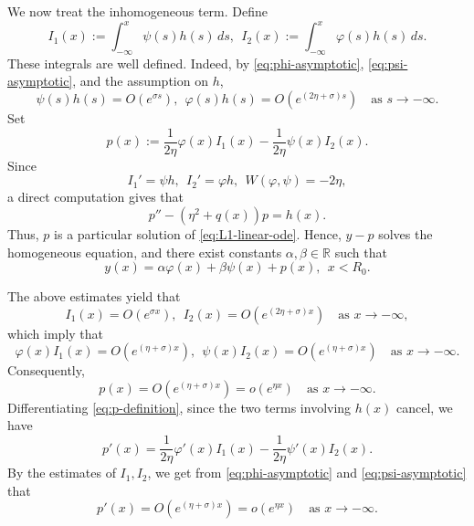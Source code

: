 \documentclass[11pt]{article}
\numberwithin{equation}{section}
\theoremstyle{definition}
\begin{document}
\medskip
{}
	
We now treat the inhomogeneous term. Define
\[
I_1(x):=\int_{-\infty}^{x}\psi(s)h(s)\,ds,
\ \
I_2(x):=\int_{-\infty}^{x}\varphi(s)h(s)\,ds .
\]
These integrals are well defined. Indeed, by \eqref{eq:phi-asymptotic},
\eqref{eq:psi-asymptotic}, and the assumption on \(h\),
\[
\psi(s)h(s)=O(e^{\sigma s}),
\ \
\varphi(s)h(s)=O(e^{(2\eta+\sigma)s})\quad \text{as }s\to-\infty.
\]
Set
\begin{equation}\label{eq:p-definition}
	p(x)
	:=
	\frac{1}{2\eta}\varphi(x)I_1(x)
	-
	\frac{1}{2\eta}\psi(x)I_2(x).
\end{equation}
Since
\[
I_1'=\psi h,
\ \
I_2'=\varphi h,
\ \
W(\varphi,\psi)=-2\eta,
\]
a direct computation gives that
\[
p''-(\eta^2+q(x))p=h(x).
\]
Thus, \(p\) is a particular solution of \eqref{eq:L1-linear-ode}. Hence,
\(y-p\) solves the homogeneous equation, and there exist constants
\(\alpha,\beta\in\mathbb R\) such that
\begin{equation}\label{eq:y-decomposition}
	y(x)=\alpha\varphi(x)+\beta\psi(x)+p(x),
	\ \  x<R_0 .
\end{equation}

\medskip
{}

The above estimates yield that
\[
I_1(x)=O(e^{\sigma x}),
\ \
I_2(x)=O(e^{(2\eta+\sigma)x})\quad \text{as }x\to-\infty,
\]
which imply that
\[
\varphi(x)I_1(x)=O(e^{(\eta+\sigma)x}),
\ \
\psi(x)I_2(x)=O(e^{(\eta+\sigma)x})\quad \text{as }x\to-\infty.
\]
Consequently,
\begin{equation}\label{eq:p-estimate}
	p(x)=O(e^{(\eta+\sigma)x})=o(e^{\eta x})\quad \text{as }x\to-\infty.
\end{equation}
Differentiating \eqref{eq:p-definition}, since  the two terms involving \(h(x)\)
cancel,  we have
\[
p'(x)
=
\frac{1}{2\eta}\varphi'(x)I_1(x)
-
\frac{1}{2\eta}\psi'(x)I_2(x).
\]
By the estimates
of \(I_1,I_2\), we get from   \eqref{eq:phi-asymptotic} and \eqref{eq:psi-asymptotic} that
\begin{equation}\label{eq:p-prime-estimate}
	p'(x)=O(e^{(\eta+\sigma)x})=o(e^{\eta x})\quad \text{as }x\to-\infty.
\end{equation}
\end{document}
